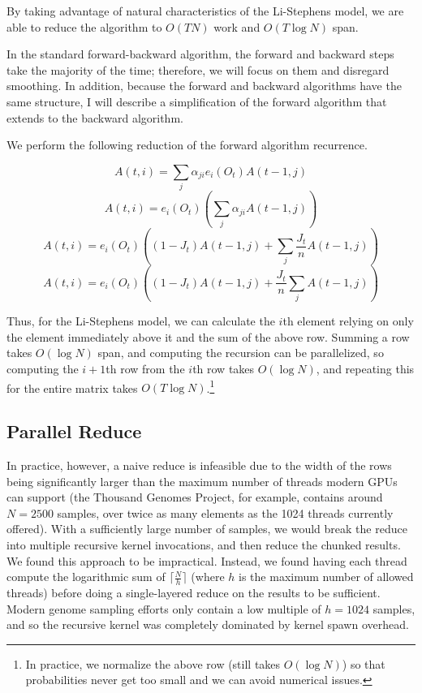 \documentclass[12pt]{article}
\begin{document}
By taking advantage of natural characteristics of the Li-Stephens model, we are able to reduce the algorithm to $O(TN)$ work and $O(T\log N)$ span.

In the standard forward-backward algorithm, the forward and backward steps take the majority of the time; therefore, we will focus on them and disregard smoothing.  In addition, because the forward and backward algorithms have the same structure, I will describe a simplification of the forward algorithm that extends to the backward algorithm.

We perform the following reduction of the forward algorithm recurrence.

$$ A(t, i) = \sum_j \alpha_{ji} e_i(O_t) A(t-1, j) $$
$$ A(t, i) = e_i(O_t) (\sum_j \alpha_{ji}  A(t-1, j)) $$
$$ A(t, i) = e_i(O_t) ((1-J_t)A(t-1, j) + \sum_j \frac{J_t}{n} A(t-1, j)) $$
$$ A(t, i) = e_i(O_t) ((1-J_t)A(t-1, j) + \frac{J_t}{n}\sum_j A(t-1, j)) $$

Thus, for the Li-Stephens model, we can calculate the $i$th element relying on only the element immediately above it and the sum of the above row.  Summing a row takes $O(\log N)$ span, and computing the recursion can be parallelized, so computing the $i+1$th row from the $i$th row takes $O(\log N)$, and repeating this for the entire matrix takes $O(T\log N)$.\footnote{In practice, we normalize the above row (still takes $O(\log N)$) so that probabilities never get too small and we can avoid numerical issues.}

\subsection{Parallel Reduce}

In practice, however, a naive reduce is infeasible due to the width of the rows
being significantly larger than the maximum number of threads modern GPUs can
support (the Thousand Genomes Project, for example, contains around $N = 2500$
samples, over twice as many elements as the 1024 threads currently offered).
With a sufficiently large number of samples, we would break the reduce into
multiple recursive kernel invocations, and then reduce the chunked results.
We found this approach to be impractical. Instead, we found having each thread
compute the logarithmic sum of $\lceil\frac{N}{h}\rceil$ (where $h$ is the
maximum number of allowed threads) before doing a single-layered reduce on the
results to be sufficient. Modern genome sampling efforts only contain a low
multiple of $h = 1024$ samples, and so the recursive kernel was completely
dominated by kernel spawn overhead.
\end{document}
